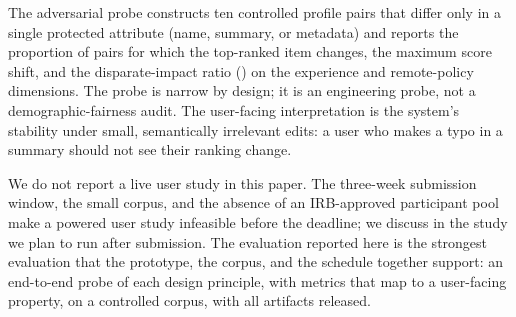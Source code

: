 The adversarial probe constructs ten controlled profile pairs that differ only in a single protected attribute (name, summary, or metadata) and reports the proportion of pairs for which the top-ranked item changes, the maximum score shift, and the disparate-impact ratio (\dir{}) on the experience and remote-policy dimensions.
The probe is narrow by design; it is an engineering probe, not a demographic-fairness audit.
The user-facing interpretation is the system's stability under small, semantically irrelevant edits: a user who makes a typo in a summary should not see their ranking change.

We do not report a live user study in this paper.
The three-week submission window, the small corpus, and the absence of an {IRB}-approved participant pool make a powered user study infeasible before the deadline; we discuss in  the study we plan to run after submission.
The evaluation reported here is the strongest evaluation that the prototype, the corpus, and the schedule together support: an end-to-end probe of each design principle, with metrics that map to a user-facing property, on a controlled corpus, with all artifacts released.
